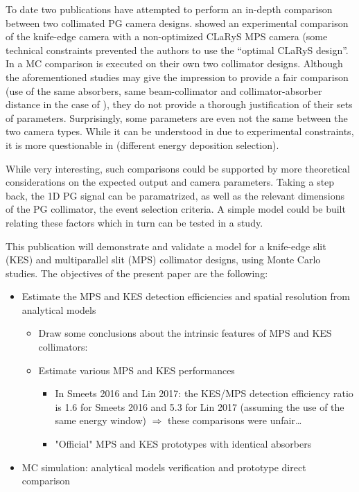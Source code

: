 \documentclass[a4paper,english]{article}
\begin{document}
To date two publications have attempted to perform an in-depth comparison between two collimated PG camera designs. \cite{Smeets2016} showed an experimental comparison of the knife-edge camera with a non-optimized CLaRyS MPS camera (some technical constraints prevented the authors to use the \enquote{optimal CLaRyS design}. In \cite{Lin2017} a MC comparison is executed on their own two collimator designs. Although the aforementioned studies may give the impression to provide a fair comparison (use of the same absorbers, same beam-collimator and collimator-absorber distance in the case of \cite{Lin2017}), they do not provide a thorough justification of their sets of parameters. Surprisingly, some parameters are even not the same between the two camera types. While it can be understood in \cite{Smeets2016} due to experimental constraints, it is more questionable in \cite{Lin2017} (different energy deposition selection).

While very interesting, such comparisons could be supported by more theoretical considerations on the expected output and camera parameters. Taking a step back, the 1D PG signal can be paramatrized, as well as the relevant dimensions of the PG collimator, the event selection criteria. A simple model could be built relating these factors which in turn can be tested in a study.

This publication will demonstrate and validate a model for a knife-edge slit (KES) and multiparallel slit (MPS) collimator designs, using Monte Carlo studies. The objectives of the present paper are the following:

\begin{itemize}
  \item Estimate the MPS and KES detection efficiencies and spatial resolution from analytical models
  \begin{itemize}
    \item Draw some conclusions about the intrinsic features of MPS and KES collimators:  
    \item Estimate various MPS and KES performances 
    \begin{itemize}
    	\item In Smeets 2016 and Lin 2017: the KES/MPS detection efficiency ratio is 1.6 for Smeets 2016 and 5.3 for Lin 2017 (assuming the use of the same energy window) $\Rightarrow$ these comparisons were unfair\dots    
        \item "Official" MPS and KES prototypes with identical absorbers 
    \end{itemize}    
  \end{itemize}
  \item MC simulation: analytical models verification and prototype direct comparison
\end{itemize}  
\end{document}
